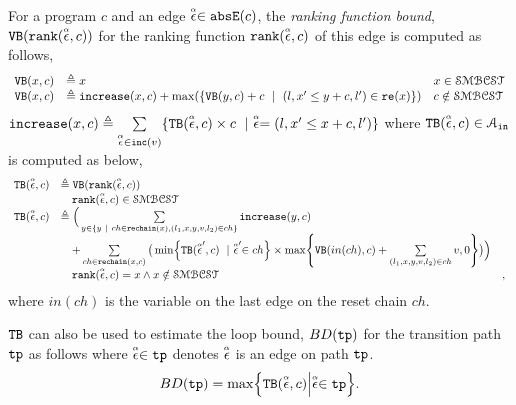   \begin{defn}
    \label{def:ranking_bound}
  For a program $c$ and an edge $\stackrel{\scriptscriptstyle{\alpha}}{\mathtt{\epsilon}{}} \in \mathtt{abs}{\mathtt{E}}(c)$,
  the \emph{ranking function bound}, ${\mathtt{VB}}(\mathtt{rank}(\stackrel{\scriptscriptstyle{\alpha}}{\mathtt{\epsilon}{}}, c))$ for the ranking function $\mathtt{rank}(\stackrel{\scriptscriptstyle{\alpha}}{\mathtt{\epsilon}{}}, c)$
  of this edge
  is computed as follows,
    \[ 
  \begin{array}{lll}
    {\ensuremath{\mathtt{VB}}}(x, c) & \triangleq x & x \in \mathcal{SMBCST} \\
    {\mathtt{VB}}(x, c) & \triangleq \mathtt{increase}(x, c) + \max(\{{\mathtt{VB}}(y, c) + c ~\mid~ (l, x' \leq y + c, l') \in \mathtt{re}(x)\}) & c \notin \mathcal{SMBCST}
  \end{array}
  \]
  $\mathtt{increase}(x, c) \triangleq \sum\limits_{\stackrel{\scriptscriptstyle{\alpha}}{\mathtt{\epsilon}{}} \in \mathtt{inc}(v)}\{{\mathtt{TB}}(\stackrel{\scriptscriptstyle{\alpha}}{\mathtt{\epsilon}{}}, c) \times c ~\mid~ \stackrel{\scriptscriptstyle{\alpha}}{\mathtt{\epsilon}{}} = (l, x' \leq x + c, l')\}$ where 
  ${\mathtt{TB}}(\stackrel{\scriptscriptstyle{\alpha}}{\mathtt{\epsilon}{}}, c) \in \mathcal{A}_{\mathtt{in}}$  is computed as below,
\[ 
\begin{array}{lll}
  \absclr(\absevent, c) 
  & \triangleq \varinvar(\locbound(\absevent, c))  & \\
  & \quad \locbound(\absevent, c) \in \constdom & \\
  \absclr(\absevent, c) 
  & \triangleq \Big(
    \sum\limits_{y \in \{ y ~|~ 
    ch \in \resetchain(x), (l_1, x, y, v, l_2) \in ch \} } \incrs(y, c) & \\
    & \quad + 
  \sum\limits_{ch \in \resetchain(x, c)}
  \big( \min\left\{\absclr(\absevent', c) ~\mid~ \absevent' \in ch\right\} \times 
  \max\left\{\varinvar(in(ch), c) + \sum\limits_{(l_1, x, y, v, l_2) \in ch } v, 0 \right\}\big) \Big)  & \\
  &  \quad \locbound(\absevent, c) = x \land x \notin \constdom & ,
\end{array}
  \]
 where $in(ch)$ is the variable on the last edge on the reset chain $ch$.
\end{defn}
${\mathtt{TB}}$ can also be used to estimate the loop bound, $BD(\mathtt{tp})$ for the transition path $\mathtt{tp}$ as follows
where $\stackrel{\scriptscriptstyle{\alpha}}{\mathtt{\epsilon}{}} \in \mathtt{tp}$ denotes $\stackrel{\scriptscriptstyle{\alpha}}{\mathtt{\epsilon}{}}$ is an edge on path $\mathtt{tp}$.
\[
  BD(\tpath) = \max\left\{ \absclr(\absevent, c) \middle\vert \absevent \in \tpath \right\}.
\]
